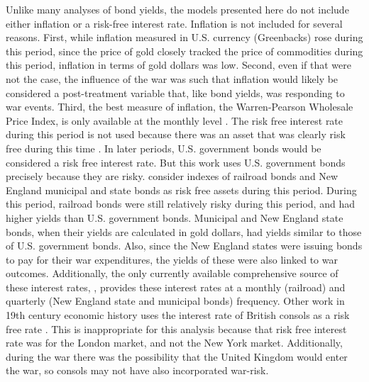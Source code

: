 Unlike many analyses of bond yields, the models presented here do not include either inflation or a risk-free interest rate.
Inflation is not included for several reasons.
First, while inflation measured in U.S. currency (Greenbacks) rose during this period, since the price of gold closely tracked the price of commodities during this period, inflation in terms of gold dollars was low\parencites{Mitchell1903}{Mitchell1908}.
Second, even if that were not the case, the influence of the war was such that inflation would likely be considered a post-treatment variable that, like bond yields, was responding to war events.
Third, the best measure of inflation, the Warren-Pearson Wholesale Price Index, is only available at the monthly level \parencite{WarrenPearson1933a}.
The risk free interest rate during this period is not used because there was an asset that was clearly risk free during this time \parencites{HomerSylla2005}.
In later periods, U.S. government bonds would be considered a risk free interest rate.
But this work uses U.S. government bonds precisely because they are risky.
\textcites{Macaulay1938}{HomerSylla2005} consider indexes of railroad bonds and New England municipal and state bonds as risk free assets during this period.
During this period, railroad bonds were still relatively risky during this period, and had higher yields than U.S. government bonds.
Municipal and New England state bonds, when their yields are calculated in gold dollars, had yields similar to those of U.S. government bonds.
Also, since the New England states were issuing bonds to pay for their war expenditures, the yields of these were also linked to war outcomes.
Additionally, the only currently available comprehensive source of these interest rates, \textcite{Macaulay1938}, provides these interest rates at a monthly (railroad) and quarterly (New England state and municipal bonds) frequency.
Other work in 19th century economic history uses the interest rate of British consols as a risk free rate \parencite{BordoRockoff1996a}.
This is inappropriate for this analysis because that risk free interest rate was for the London market, and not the New York market.
Additionally, during the war there was the possibility that the United Kingdom would enter the war, so consols may not have also incorporated war-risk.


